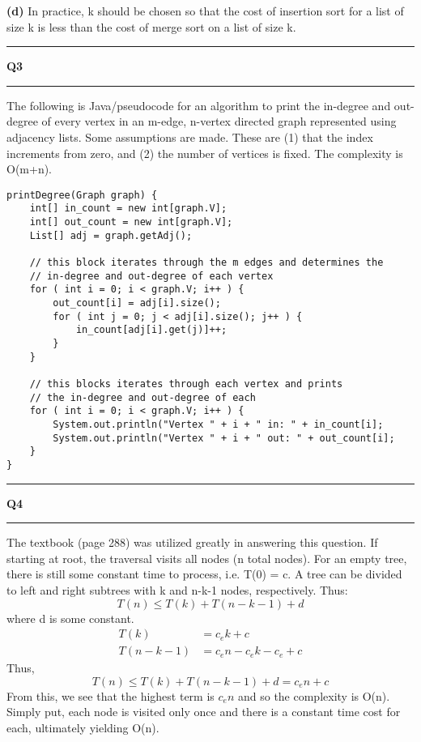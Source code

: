 \documentclass[11pt]{article}
\newcommand\question[2]{\vspace{.25in}\hrule\textbf{#1 #2}\vspace{.5em}\hrule\vspace{.10in}}
\renewcommand\part[1]{\vspace{.10in}\textbf{(#1)}}
\begin{document}
\part{d} In practice, k should be chosen so that the cost of insertion sort for a list of size k is less than the cost of merge sort on a list of size k.

\question{Q3}{}
The following is Java/pseudocode for an algorithm to print the in-degree and out-degree of every vertex in an m-edge, n-vertex directed graph represented using adjacency lists. Some assumptions are made. These are (1) that the index increments from zero, and (2) the number of vertices is fixed. The complexity is O(m+n).
\begin{lstlisting}
printDegree(Graph graph) {
	int[] in_count = new int[graph.V];
	int[] out_count = new int[graph.V];
	List[] adj = graph.getAdj();
	
	// this block iterates through the m edges and determines the 
	// in-degree and out-degree of each vertex
	for ( int i = 0; i < graph.V; i++ ) { 
		out_count[i] = adj[i].size();
		for ( int j = 0; j < adj[i].size(); j++ ) {
			in_count[adj[i].get(j)]++;
		}
	}

	// this blocks iterates through each vertex and prints
	// the in-degree and out-degree of each
	for ( int i = 0; i < graph.V; i++ ) {
		System.out.println("Vertex " + i + " in: " + in_count[i];
		System.out.println("Vertex " + i + " out: " + out_count[i];
	}
}
\end{lstlisting}

\question{Q4}{}
The textbook (page 288) was utilized greatly in answering this question. If starting at root, the traversal visits all nodes (n total nodes). For an empty tree, there is still some constant time to process, i.e. T(0) = c. A tree can be divided to left and right subtrees with k and n-k-1 nodes, respectively. Thus:
\begin{equation*}
T(n) \leq T(k) + T(n-k-1) + d
\end{equation*}
where d is some constant.
\begin{align*}
T(k) & = c_ek + c \\
T(n-k-1) & = c_en - c_ek - c_e + c
\end{align*}
Thus,
\begin{equation*}
T(n) \leq T(k) + T(n-k-1) + d = c_en+c
\end{equation*}
From this, we see that the highest term is $c_en$ and so the complexity is O(n). Simply put, each node is visited only once and there is a constant time cost for each, ultimately yielding O(n).
\end{document}
